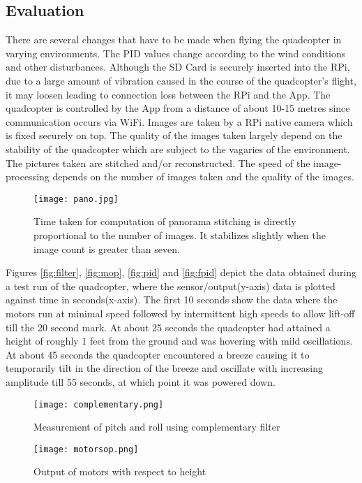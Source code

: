 \subsection{Evaluation}
There are several changes that have to be made when flying the quadcopter in varying environments. The PID values change according to the wind conditions and other disturbances. Although the SD Card is securely inserted into the RPi, due to a large amount of vibration caused in the course of the quadcopter's flight, it may loosen leading to connection loss between the RPi and the App. 
\newline \newline
The quadcopter is controlled by the App from a distance of about 10-15 metres since communication occurs via WiFi. Images are taken by a RPi native camera which is fixed securely on top. The quality of the images taken largely depend on the stability of the quadcopter which are subject to the vagaries of the environment.
The pictures taken are stitched and/or reconstructed. The speed of the image-processing depends on the number of images taken and the quality of the images. 
\begin{figure}[H]
  \centering
  \texttt{[image: pano.jpg]}
  \caption{Time taken for computation of panorama stitching is directly proportional to the number of images. It stabilizes slightly when the image count is greater than seven.}
  \label{panorama stitching time graph} 
\end{figure}
\noindent
Figures \ref{fig:filter}, \ref{fig:mop}, \ref{fig:pid} and \ref{fig:fpid} depict the data obtained during a test run of the quadcopter, where the sensor/output(y-axis) data is plotted against time in seconds(x-axis).
The first 10 seconds show the data where the motors run at minimal speed followed by intermittent high speeds to allow lift-off till the 20 second mark. At about 25 seconds the quadcopter had attained a height of roughly 1 feet from the ground and was hovering with mild oscillations. At about 45 seconds the quadcopter encountered a breeze causing it to temporarily tilt in the direction of the breeze and oscillate with increasing amplitude till 55 seconds, at which point it was powered down.
\begin{figure}[H]
  \centering
  \texttt{[image: complementary.png]}
  \caption{Measurement of pitch and roll using complementary filter \label{fig:filter}}
  \label{Measurement of pitch and roll} 
\end{figure}
\begin{figure}[H]
  \centering
  \texttt{[image: motorsop.png]}
  \caption{Output of motors with respect to height\label{fig:mop}}
  \label{Motor output}  
\end{figure}
